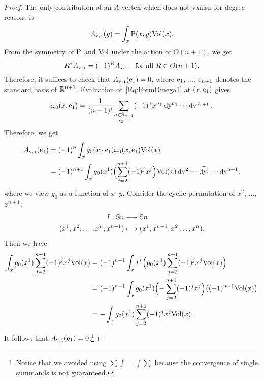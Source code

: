 \documentclass[\MainFolder/Text.tex]{subfiles}
\begin{document}
\begin{proof}
The only contribution of an $A$-vertex which does not vanish for degree reasons is
\[ A_{\NVol,\NOne}(y) = \int_x \Prpg(x,y) \Vol(x). \]
From the symmetry of $\mathrm{P}$ and $\mathrm{Vol}$ under the action of $O(n+1)$, we get
\[ R^* A_{\NVol, \NOne} = (-1)^R A_{\NVol, \NOne}\quad\text{for all }R\in O(n+1). \]
Therefore, it suffices to check that $A_{\NVol, \NOne}(\StdBasis_1) = 0$, where $\mathrm{e}_1$, $\dotsc$, $\mathrm{e}_{n+1}$ denotes the standard basis of $\mathbb{R}^{n+1}$.
Evaluation of~\eqref{Eq:FormOmega1} at $(x,\mathrm{e}_1)$ gives
\[ \omega_0(x,\mathrm{e}_1) = \frac{1}{(n-1)!} \sum_{\substack{\sigma\in\mathbb{S}_{n+1}\\ \sigma_2 = 1}} (-1)^\sigma x^{\sigma_1} \operatorname{dy^{\sigma_3}} \dotsm \operatorname{dy^{\sigma_{n+1}}}. \]
Therefore, we get
\begin{align*}
A_{\NVol, \NOne}(\StdBasis_1) &= (-1)^n \int_x g_0(x\cdot \StdBasis_1) \omega_0(x,\StdBasis_1) \Vol(x)  \\ 
&= (-1)^{n+1} \int_x g_0(x^1) \Bigl( \sum_{j=2}^{n+1} (-1)^{j} x^j\Bigr) \Vol(x) \Diff{y^2} \dotsm  \widehat{\Diff{y^j}} \dotsm \Diff{y^{n+1}},
\end{align*}
where we view $g_0$ as a function of $x\cdot y$.
Consider the cyclic permutation of $x^2$, $\dotsc$, $x^{n+1}$:
\begin{align*} 
I:\mathbb{S}{n} &\longrightarrow \mathbb{S}{n} \\
   (x^1, x^2, \dotsc, x^n, x^{n+1}) &\longmapsto (x^1, x^{n+1}, x^2 \dotsc, x^{n}). 
\end{align*}
Then we have
\begin{align*}
\int_x g_0(x^1) \sum_{j=2}^{n+1} (-1)^{j} x^j \mathrm{Vol}(x)  &= (-1)^{n-1}\int_x I^*\Bigl(g_0(x^1) \sum_{j=2}^{n+1} (-1)^{j} x^j \mathrm{Vol}(x)\Bigr) \\
& = (-1)^{n-1} \int_x g_0(x^1)\Bigl(-\sum_{j=2}^{n+1} (-1)^j x^j\Bigr)\bigl((-1)^{n-1}\mathrm{Vol}(x)\bigr) \\
& = - \int_x g_0(x^1) \sum_{j=2}^{n+1} (-1)^{j} x^j \mathrm{Vol}(x).
\end{align*}
It follows that $A_{\NVol,\NOne}(\StdBasis_1)=0$.\footnote{Notice that we avoided using $\sum \int = \int \sum$ because the convergence of single summands is not guaranteed.}


\end{proof}
\end{document}
